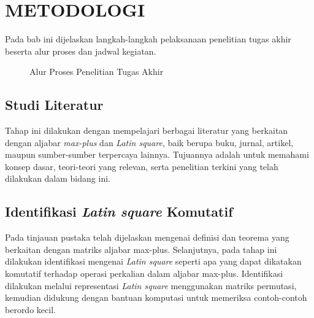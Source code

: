 \chapter{METODOLOGI}


Pada bab ini dijelaskan langkah-langkah pelaksanaan penelitian tugas akhir beserta alur proses dan jadwal kegiatan.
\begin{figure}[H]
  \centering
  \caption{Alur Proses Penelitian Tugas Akhir}
  \label{fig:metodologi}
\end{figure}

\section{Studi Literatur}
Tahap ini dilakukan dengan mempelajari berbagai literatur yang berkaitan dengan aljabar \textit{max-plus} dan \textit{Latin square}, baik berupa buku, jurnal, artikel, maupun sumber-sumber terpercaya lainnya.
Tujuannya adalah untuk memahami konsep dasar, teori-teori yang relevan, serta penelitian terkini yang telah dilakukan dalam bidang ini.

\section{Identifikasi \textit{Latin square} Komutatif}
Pada tinjauan pustaka telah dijelaskan mengenai definisi dan teorema yang berkaitan dengan matriks aljabar max-plus. Selanjutnya, pada tahap ini dilakukan identifikasi mengenai \textit{Latin square} seperti apa yang dapat dikatakan komutatif terhadap operasi perkalian dalam aljabar max-plus. Identifikasi dilakukan melalui representasi \textit{Latin square} menggunakan matriks permutasi, kemudian didukung dengan bantuan komputasi untuk memeriksa contoh-contoh berordo kecil.


